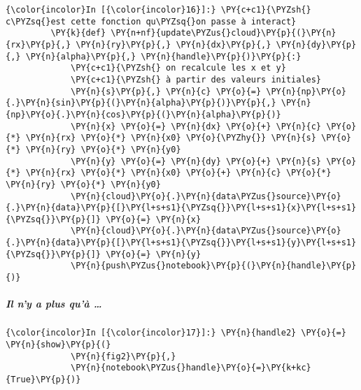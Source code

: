     \begin{Verbatim}[commandchars=\\\{\},frame=single,framerule=0.3mm,rulecolor=\color{cellframecolor}]
{\color{incolor}In [{\color{incolor}16}]:} \PY{c+c1}{\PYZsh{} c\PYZsq{}est cette fonction qu\PYZsq{}on passe à interact}
         \PY{k}{def} \PY{n+nf}{update\PYZus{}cloud}\PY{p}{(}\PY{n}{rx}\PY{p}{,} \PY{n}{ry}\PY{p}{,} \PY{n}{dx}\PY{p}{,} \PY{n}{dy}\PY{p}{,} \PY{n}{alpha}\PY{p}{,} \PY{n}{handle}\PY{p}{)}\PY{p}{:}
             \PY{c+c1}{\PYZsh{} on recalcule les x et y}
             \PY{c+c1}{\PYZsh{} à partir des valeurs initiales}
             \PY{n}{s}\PY{p}{,} \PY{n}{c} \PY{o}{=} \PY{n}{np}\PY{o}{.}\PY{n}{sin}\PY{p}{(}\PY{n}{alpha}\PY{p}{)}\PY{p}{,} \PY{n}{np}\PY{o}{.}\PY{n}{cos}\PY{p}{(}\PY{n}{alpha}\PY{p}{)}
             \PY{n}{x} \PY{o}{=} \PY{n}{dx} \PY{o}{+} \PY{n}{c} \PY{o}{*} \PY{n}{rx} \PY{o}{*} \PY{n}{x0} \PY{o}{\PYZhy{}} \PY{n}{s} \PY{o}{*} \PY{n}{ry} \PY{o}{*} \PY{n}{y0}
             \PY{n}{y} \PY{o}{=} \PY{n}{dy} \PY{o}{+} \PY{n}{s} \PY{o}{*} \PY{n}{rx} \PY{o}{*} \PY{n}{x0} \PY{o}{+} \PY{n}{c} \PY{o}{*} \PY{n}{ry} \PY{o}{*} \PY{n}{y0}
             \PY{n}{cloud}\PY{o}{.}\PY{n}{data\PYZus{}source}\PY{o}{.}\PY{n}{data}\PY{p}{[}\PY{l+s+s1}{\PYZsq{}}\PY{l+s+s1}{x}\PY{l+s+s1}{\PYZsq{}}\PY{p}{]} \PY{o}{=} \PY{n}{x}
             \PY{n}{cloud}\PY{o}{.}\PY{n}{data\PYZus{}source}\PY{o}{.}\PY{n}{data}\PY{p}{[}\PY{l+s+s1}{\PYZsq{}}\PY{l+s+s1}{y}\PY{l+s+s1}{\PYZsq{}}\PY{p}{]} \PY{o}{=} \PY{n}{y}
             \PY{n}{push\PYZus{}notebook}\PY{p}{(}\PY{n}{handle}\PY{p}{)}
\end{Verbatim}


    \hypertarget{il-ny-a-plus-quuxe0}{%
\subparagraph{Il n'y a plus qu'à \ldots{}}\label{il-ny-a-plus-quuxe0}}

    \begin{Verbatim}[commandchars=\\\{\},frame=single,framerule=0.3mm,rulecolor=\color{cellframecolor}]
{\color{incolor}In [{\color{incolor}17}]:} \PY{n}{handle2} \PY{o}{=} \PY{n}{show}\PY{p}{(}
             \PY{n}{fig2}\PY{p}{,}
             \PY{n}{notebook\PYZus{}handle}\PY{o}{=}\PY{k+kc}{True}\PY{p}{)}
\end{Verbatim}


    
    
    
    

